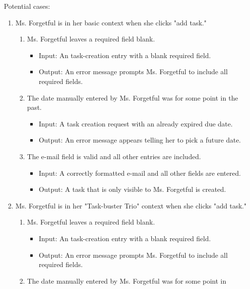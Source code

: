 Potential cases:
\begin{enumerate}
    \item Ms. Forgetful is in her basic context when she clicks "add task."
    \begin{enumerate}
        \item Ms. Forgetful leaves a required field blank.
            \begin{itemize}
                \item Input: An task-creation entry with a blank required
field.
                \item Output: An error message prompts Ms. Forgetful to
include all required fields.
            \end{itemize}
        \item The date manually entered by Ms. Forgetful was for some point in
the past.
            \begin{itemize}
                \item Input: A task creation request with an already expired
due date.
                \item Output: An error message appears telling her to pick a
future date.
            \end{itemize}
        \item The e-mail field is valid and all other entries are included.
            \begin{itemize}
                \item Input: A correctly formatted e-mail and all other fields
are entered.
                \item Output: A task that is only visible to Ms. Forgetful is
created.
            \end{itemize}
    \end{enumerate}
\item Ms. Forgetful is in her "Task-buster Trio" context when she clicks "add
task."
     \begin{enumerate}
        \item Ms. Forgetful leaves a required field blank.
            \begin{itemize}
                \item Input: An task-creation entry with a blank required
field.
                \item Output: An error message prompts Ms. Forgetful to
include all required fields.
            \end{itemize}
        \item The date manually entered by Ms. Forgetful was for some point in

\end{enumerate}
\end{enumerate}

